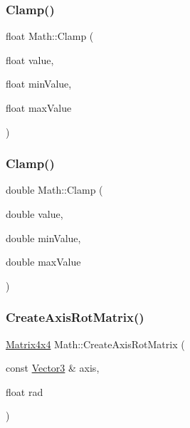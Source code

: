 \subsubsection{\texorpdfstring{Clamp()}{Clamp()}\hspace{0.1cm}{\footnotesize\ttfamily [1/2]}}
{\footnotesize\ttfamily float Math\+::\+Clamp (\begin{DoxyParamCaption}\item[{float}]{value,  }\item[{float}]{min\+Value,  }\item[{float}]{max\+Value }\end{DoxyParamCaption})}

\mbox{\label{namespace_math_a9e59da084cd78b8cd7bc184931280f62}} 
\subsubsection{\texorpdfstring{Clamp()}{Clamp()}\hspace{0.1cm}{\footnotesize\ttfamily [2/2]}}
{\footnotesize\ttfamily double Math\+::\+Clamp (\begin{DoxyParamCaption}\item[{double}]{value,  }\item[{double}]{min\+Value,  }\item[{double}]{max\+Value }\end{DoxyParamCaption})}

\mbox{\label{namespace_math_ade59dd308fe183bc0c185f8d1c6d7074}} 
\subsubsection{\texorpdfstring{Create\+Axis\+Rot\+Matrix()}{CreateAxisRotMatrix()}}
{\footnotesize\ttfamily \mbox{\hyperlink{struct_math_1_1_matrix4x4}{Matrix4x4}} Math\+::\+Create\+Axis\+Rot\+Matrix (\begin{DoxyParamCaption}\item[{const \mbox{\hyperlink{struct_math_1_1_vector3}{Vector3}} \&}]{axis,  }\item[{float}]{rad }\end{DoxyParamCaption})}



